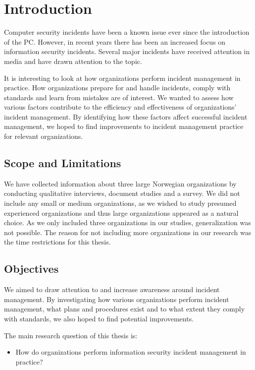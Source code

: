 \chapter{Introduction}
\label{chp:introduction}
Computer security incidents have been a known issue ever since the introduction of the PC. However, in recent years there has been an increased focus on information security incidents. Several major incidents have received attention in media and have drawn attention to the topic. %

It is interesting to look at how organizations perform incident management in practice. How organizations prepare for and handle incidents, comply with standards and learn from mistakes are of interest. We wanted to assess how various factors contribute to the efficiency and effectiveness of organizations’ incident management. By identifying how these factors affect successful incident management, we hoped to find improvements to incident management practice for relevant organizations. 



\section{Scope and Limitations}
We have collected information about three large Norwegian organizations by conducting qualitative interviews, document studies and a survey. We did not include any small or medium organizations, as we wished to study presumed experienced organizations and thus large organizations appeared as a natural choice. As we only included three organizations in our studies, generalization was not possible. The reason for not including more organizations in our research was the time restrictions for this thesis.

\section{Objectives}
\label{sec:objectives}
We aimed to draw attention to and increase awareness around incident management. By investigating how various organizations perform incident management, what plans and procedures exist and to what extent they comply with standards, we also hoped to find potential improvements.

The main research question of this thesis is:
\begin{itemize}
\item How do organizations perform information security incident management in practice?
\end{itemize}

